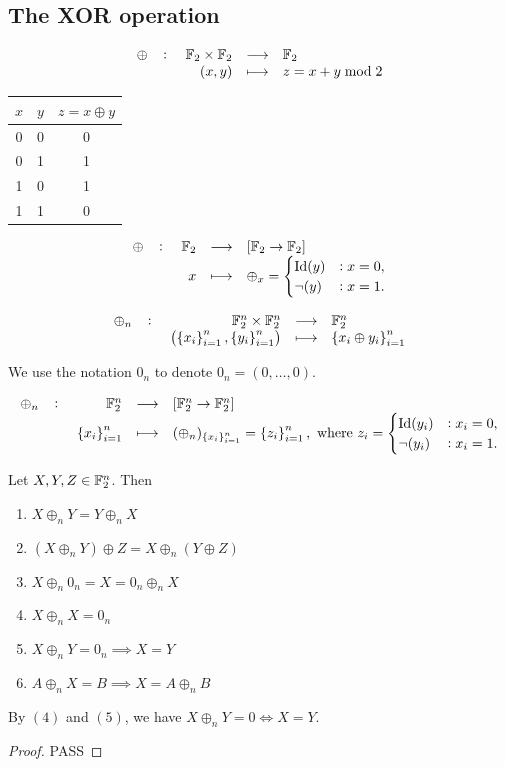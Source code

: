 \documentclass[11pt,openany]{article}
\begin{document}
\subsection{The XOR operation}
\[
\fullfunction{\oplus}{\F_2\times\F_2}{\F_2}{(x,y)}{z=x+y\bmod 2}
\]
\begin{center}
	\begin{tabular}{c|c||c}
		\toprule[1.2pt]
		$x$ & $y$ & $z=x\oplus y$\\
		\hline
		0 & 0 & 0\\
		\hline
		0 & 1 & 1\\
		\hline
		1 & 0 & 1\\
		\hline
		1 & 1 & 0\\
		\bottomrule[1.2pt]
	\end{tabular}
\end{center}

\begin{note}[Thinking]
	\[
	\fullfunction{\oplus}{\F_2}{[\F_2\to\F_2]}{x}{\oplus_x=\begin{cases}
			\id(y) &: x=0,\\
			\lnot(y) &: x=1.
	\end{cases}}
	\]
\end{note}


\newpage
\[
\fullfunction{\oplus_n}{\F_2^n\times\F_2^n}{\F_2^n}{\left(\set{x_i}_{i=1}^n,\set{y_i}_{i=1}^n\right)}{\set{x_i\oplus y_i}_{i=1}^n}
\]
\begin{note}
	We use the notation $0_n$ to denote $0_n=(0,\dots,0)$.
\end{note}
\begin{note}[Thinking]
	\[
	\fullfunction{\oplus_n}{\F_2^n}{[\F_2^n\to\F_2^n]}{\set{x_i}_{i=1}^n}{(\oplus_n)_{\set{x_i}_{i=1}^n}=\set{z_i}_{i=1}^n,\ \text{where}\ z_i=\begin{cases}
			\id(y_i) &: x_i=0,\\
			\lnot(y_i) &: x_i=1.
	\end{cases}}
	\]
\end{note}

\begin{probox}{}
\begin{proposition}
	Let $X,Y,Z\in\mathbb{F}_2^n$. Then
	\begin{enumerate}[(1)]
		\item $X\oplus_n Y=Y\oplus_n X$
		\item $(X\oplus_n Y)\oplus Z=X\oplus_n (Y\oplus Z)$
		\item $X\oplus_n 0_n=X=0_n\oplus_n X$
		\item $X\oplus_n X=0_n$
		\item $X\oplus_n Y=0_n\implies X=Y$
		\item $A\oplus_n X=B\implies X=A\oplus_n B$
	\end{enumerate}
\end{proposition}
\end{probox}
\begin{note}
	By $(4)$ and $(5)$, we have $X\oplus_n Y=0\iff X=Y$.
\end{note}
\begin{proof}
	PASS
\end{proof}
\end{document}
